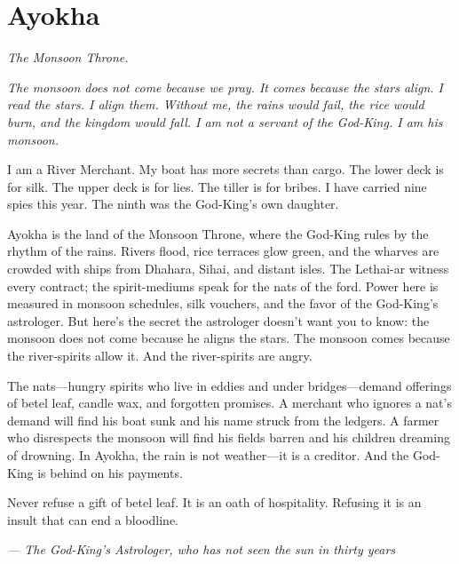 \newpage

\newpage

\chapter{Ayokha}
\emph{The Monsoon Throne.}

\noindent
{\Large
\textit{The monsoon does not come because we pray. It comes because the stars align. I read the stars. I align them. Without me, the rains would fail, the rice would burn, and the kingdom would fall. I am not a servant of the God-King. I am his monsoon.}

\vspace{0.5em}

I am a River Merchant. My boat has more secrets than cargo. The lower deck is for silk. The upper deck is for lies. The tiller is for bribes. I have carried nine spies this year. The ninth was the God-King's own daughter.

\vspace{0.5em}

Ayokha is the land of the Monsoon Throne, where the God-King rules by the rhythm of the rains. Rivers flood, rice terraces glow green, and the wharves are crowded with ships from Dhahara, Sihai, and distant isles. The Lethai-ar witness every contract; the spirit-mediums speak for the nats of the ford. Power here is measured in monsoon schedules, silk vouchers, and the favor of the God-King's astrologer. But here's the secret the astrologer doesn't want you to know: the monsoon does not come because he aligns the stars. The monsoon comes because the river-spirits allow it. And the river-spirits are angry.

\vspace{0.5em}

The nats---hungry spirits who live in eddies and under bridges---demand offerings of betel leaf, candle wax, and forgotten promises. A merchant who ignores a nat's demand will find his boat sunk and his name struck from the ledgers. A farmer who disrespects the monsoon will find his fields barren and his children dreaming of drowning. In Ayokha, the rain is not weather---it is a creditor. And the God-King is behind on his payments.

\vspace{0.5em}

Never refuse a gift of betel leaf. It is an oath of hospitality. Refusing it is an insult that can end a bloodline.

\vspace{1em}

\noindent\textit{--- The God-King's Astrologer, who has not seen the sun in thirty years}
}

